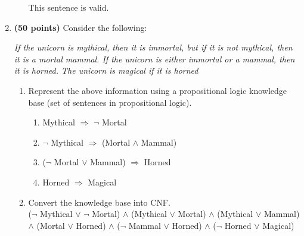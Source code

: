 \documentclass[12pt]{article}
\begin{document}
\begin{enumerate}
\begin{itemize}
		\begin{table}[!ht]
			\centering
		\end{table}

		This sentence is valid.
	\end{itemize}

	\item \textbf{(50 points)} Consider the following:

	\textit{If the unicorn is mythical, then it is immortal, but if it is not mythical, then it is a mortal mammal. If the unicorn is either immortal or a mammal, then it is horned. The unicorn is magical if it is horned}

	\begin{enumerate}
		\item Represent the above information using a propositional logic knowledge base (set of sentences in propositional logic). \\

		\begin{enumerate}[label=\arabic*.]
			\item Mythical $\Rightarrow$ $\neg$ Mortal
			\item $\neg$ Mythical $\Rightarrow$ (Mortal $\land$ Mammal)
			\item ($\neg$ Mortal $\lor$ Mammal) $\Rightarrow$ Horned
			\item Horned $\Rightarrow$ Magical \\
		\end{enumerate}

		\item Convert the knowledge base into CNF. \\

		($\neg$ Mythical $\lor$ $\neg$ Mortal) $\land$ (Mythical $\lor$ Mortal) $\land$ (Mythical $\lor$ Mammal) $\land$ (Mortal $\lor$ Horned) $\land$ ($\neg$ Mammal $\lor$ Horned) $\land$ ($\neg$ Horned $\lor$ Magical) \\


\end{enumerate}
\end{enumerate}
\end{document}
